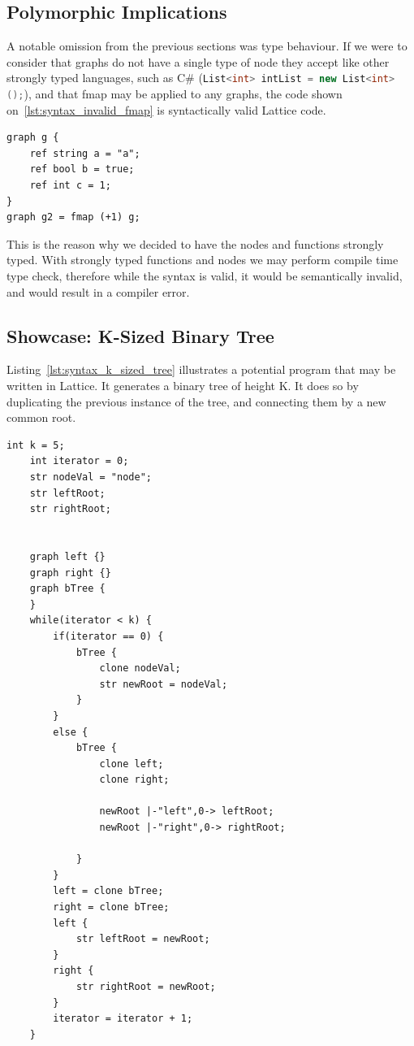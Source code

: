 \subsection{Polymorphic Implications}\label{subsec:syntax_polymorphic_implications}
A notable omission from the previous sections was type behaviour.
If we were to consider that graphs do not have a single
type of node they accept like other strongly typed languages, such as C\# (\lstinline[language=C#]{List<int> intList = new List<int>();}),
and that fmap may be applied to any graphs, the code shown on~\ref{lst:syntax_invalid_fmap} is syntactically valid Lattice code.

\begin{lstlisting}[caption={Fmap applied on a graph that contains non-numeric values.},captionpos=b,label={lst:syntax_invalid_fmap}]
graph g {
    ref string a = "a";
    ref bool b = true;
    ref int c = 1;
}
graph g2 = fmap (+1) g;
\end{lstlisting}


This is the reason why we decided to have the nodes and functions strongly typed.
With strongly typed functions and nodes we may perform compile time type check, therefore while the syntax is valid,
it would be semantically invalid, and would result in a compiler error.


\subsection{Showcase: K-Sized Binary Tree}\label{subsec:syntax_showcase_k_sized_binary_tree}
Listing~\ref{lst:syntax_k_sized_tree} illustrates a potential program that may be written in Lattice.
It generates a binary tree of height K.
It does so by duplicating the previous instance of the tree, and connecting them by a new common root.

\begin{lstlisting}[caption={Lattice code generating a balanced binary tree of height K.},captionpos=b,label={lst:syntax_k_sized_tree}]
    int k = 5;
    int iterator = 0;
    str nodeVal = "node";
    str leftRoot;
    str rightRoot;


    graph left {}
    graph right {}
    graph bTree {
    }
    while(iterator < k) {
        if(iterator == 0) {
            bTree {
                clone nodeVal;
                str newRoot = nodeVal;
            }
        }
        else {
            bTree {
                clone left;
                clone right;

                newRoot |-"left",0-> leftRoot;
                newRoot |-"right",0-> rightRoot;

            }
        }
        left = clone bTree;
        right = clone bTree;
        left {
            str leftRoot = newRoot;
        }
        right {
            str rightRoot = newRoot;
        }
        iterator = iterator + 1;
    }
\end{lstlisting}